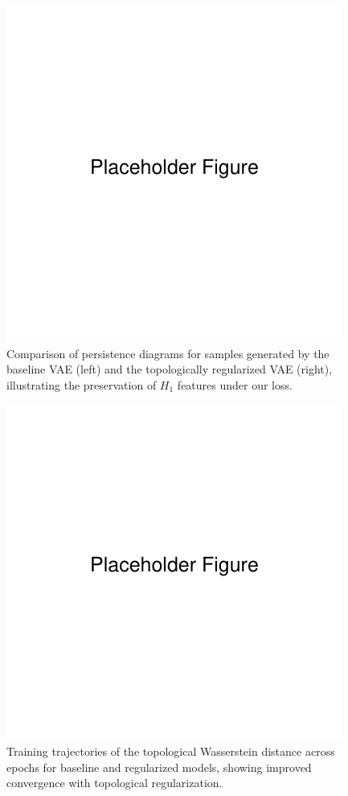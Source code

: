 \documentclass[11pt]{article}
\begin{document}
\begin{figure}[t]
    \centering
    \includegraphics[width=0.75\linewidth]{figures/placeholder.pdf}
    \caption{Comparison of persistence diagrams for samples generated by the baseline VAE (left) and the topologically regularized VAE (right), illustrating the preservation of $H_1$ features under our loss.}
    \label{fig:generated_pds}
\end{figure}

\begin{figure}[t]
    \centering
    \includegraphics[width=0.75\linewidth]{figures/placeholder.pdf}
    \caption{Training trajectories of the topological Wasserstein distance across epochs for baseline and regularized models, showing improved convergence with topological regularization.}
    \label{fig:wasserstein_epochs}
\end{figure}
\end{document}
